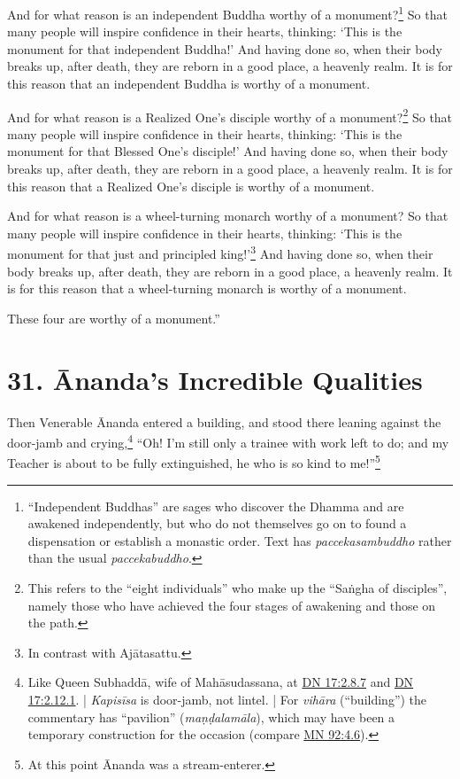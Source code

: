 \documentclass[12pt,openany]{book}%
\begin{document}
And for what reason is an independent Buddha worthy of a monument?\footnote{“Independent Buddhas” are sages who discover the Dhamma and are awakened independently, but who do not themselves go on to found a dispensation or establish a monastic order. Text has \textit{paccekasambuddho} rather than the usual \textit{paccekabuddho}. } So that many people will inspire confidence in their hearts, thinking: ‘This is the monument for that independent Buddha!’ And having done so, when their body breaks up, after death, they are reborn in a good place, a heavenly realm. It is for this reason that an independent Buddha is worthy of a monument. 

And for what reason is a Realized One’s disciple worthy of a monument?\footnote{This refers to the “eight individuals” who make up the “\textsanskrit{Saṅgha} of disciples”, namely those who have achieved the four stages of awakening and those on the path. } So that many people will inspire confidence in their hearts, thinking: ‘This is the monument for that Blessed One’s disciple!’ And having done so, when their body breaks up, after death, they are reborn in a good place, a heavenly realm. It is for this reason that a Realized One’s disciple is worthy of a monument. 

And for what reason is a wheel-turning monarch worthy of a monument? So that many people will inspire confidence in their hearts, thinking: ‘This is the monument for that just and principled king!’\footnote{In contrast with \textsanskrit{Ajātasattu}. } And having done so, when their body breaks up, after death, they are reborn in a good place, a heavenly realm. It is for this reason that a wheel-turning monarch is worthy of a monument. 

These four are worthy of a monument.” 

\section*{31. Ānanda’s Incredible Qualities }

Then Venerable Ānanda entered a building, and stood there leaning against the door-jamb and crying,\footnote{Like Queen \textsanskrit{Subhaddā}, wife of \textsanskrit{Mahāsudassana}, at \href{https://suttacentral.net/dn17/en/sujato\#2.8.7}{DN 17:2.8.7} and \href{https://suttacentral.net/dn17/en/sujato\#2.12.1}{DN 17:2.12.1}. | \textit{\textsanskrit{Kapisīsa}} is door-jamb, not lintel. | For \textit{\textsanskrit{vihāra}} (“building”) the commentary has “pavilion” (\textit{\textsanskrit{maṇḍalamāla}}), which may have been a temporary construction for the occasion (compare \href{https://suttacentral.net/mn92/en/sujato\#4.6}{MN 92:4.6}). } “Oh! I’m still only a trainee with work left to do; and my Teacher is about to be fully extinguished, he who is so kind to me!”\footnote{At this point Ānanda was a stream-enterer. } 
\end{document}
